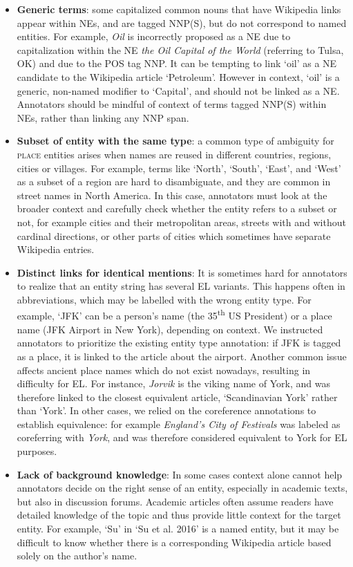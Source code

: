 \documentclass[11pt,a4paper]{article}
\begin{document}
\begin{itemize}
  \item \textbf{Generic terms}: some capitalized common nouns that have Wikipedia links appear within NEs, and are tagged NNP(S), but do not correspond to named entities. For example, \textit{Oil} is incorrectly proposed as a NE due to capitalization within the NE \textit{the Oil Capital of the World} (referring to Tulsa, OK) and due to the POS tag NNP. It can be tempting to link `oil' as a NE candidate to the Wikipedia article `Petroleum'. However in context, `oil' is a generic, non-named modifier to `Capital', and should not be linked as a NE. Annotators should be mindful of context of terms tagged NNP(S) within NEs, rather than linking any NNP span.
  \item \textbf{Subset of entity with the same type}: a common type of ambiguity  for \textsc{place} entities arises when names are reused in different countries, regions, cities or villages. For example, terms like `North', `South', `East', and `West' as a subset of a region are hard to disambiguate, and they are common in street names in North America. In this case, annotators must look at the broader context and carefully check whether the entity refers to a subset or not, for example cities and their metropolitan areas, streets with and without cardinal directions, or other parts of cities which sometimes have separate Wikipedia entries.
  \item \textbf{Distinct links for identical mentions}: It is sometimes hard for annotators to realize that an entity string has several EL variants. This happens often in abbreviations, which may be labelled with the wrong entity type. For example, `JFK' can be a person's name (the 35\textsuperscript{th} US President) or a place name (JFK Airport in New York), depending on context. We instructed annotators to prioritize the existing entity type annotation: if JFK is tagged as a place, it is linked to the article about the airport. Another common issue affects ancient place names which do not exist nowadays, resulting in difficulty for EL. For instance, \textit{Jorvik} is the viking name of York, and was therefore linked to the closest equivalent article, `Scandinavian York' rather than `York'. In other cases, we relied on the coreference annotations to establish equivalence: for example \textit{England's City of Festivals} was labeled as coreferring with \textit{York}, and was therefore considered equivalent to York for EL purposes.
  
  \item \textbf{Lack of background knowledge}: In some cases context alone cannot help annotators decide on the right sense of an entity, especially in academic texts, but also in discussion forums. Academic articles often assume readers have detailed knowledge of the topic and thus provide little context for the target entity. For example, `Su' in `Su et al. 2016' is a named entity, but it may be difficult to know whether there is a corresponding Wikipedia article based solely on the author's name.
\end{itemize}
\end{document}
